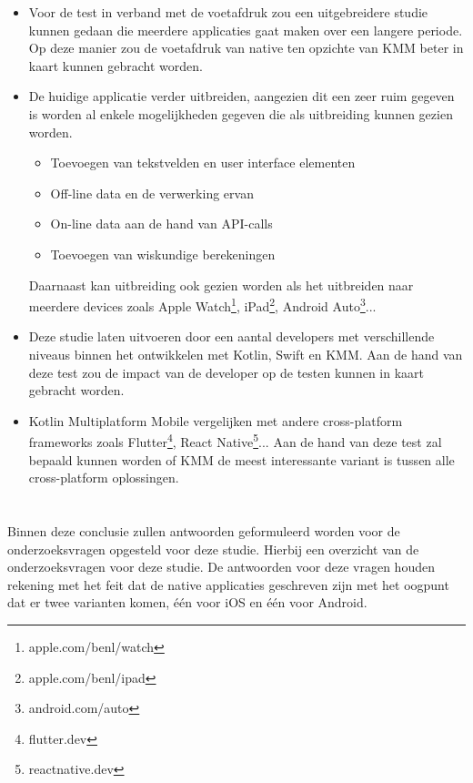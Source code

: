 \begin{itemize}
    \item Voor de test in verband met de voetafdruk zou een uitgebreidere studie kunnen gedaan die meerdere applicaties gaat maken over een langere periode. Op deze manier zou de voetafdruk van native ten opzichte van KMM beter in kaart kunnen gebracht worden.
    
    \item De huidige applicatie verder uitbreiden, aangezien dit een zeer ruim gegeven is worden al enkele mogelijkheden gegeven die als uitbreiding kunnen gezien worden.
    \begin{itemize}
        \item Toevoegen van tekstvelden en user interface elementen
        \item Off-line data en de verwerking ervan
        \item On-line data aan de hand van API-calls
        \item Toevoegen van wiskundige berekeningen
    \end{itemize}
    
    Daarnaast kan uitbreiding ook gezien worden als het uitbreiden naar meerdere devices zoals Apple Watch\footnote{apple.com/benl/watch}, iPad\footnote{apple.com/benl/ipad}, Android Auto\footnote{android.com/auto}... 
    
    \item Deze studie laten uitvoeren door een aantal developers met verschillende niveaus binnen het ontwikkelen met Kotlin, Swift en KMM. Aan de hand van deze test zou de impact van de developer op de testen kunnen in kaart gebracht worden.
    
    \item Kotlin Multiplatform Mobile vergelijken met andere cross-platform frameworks zoals Flutter\footnote{flutter.dev}, React Native\footnote{reactnative.dev}... Aan de hand van deze test zal bepaald kunnen worden of KMM de meest interessante variant is tussen alle cross-platform oplossingen.
\end{itemize}


\section{}
\label{sec:C-algemene-conclusie}    
Binnen deze conclusie zullen antwoorden geformuleerd worden voor de onderzoeksvragen opgesteld voor deze studie. Hierbij een overzicht van de onderzoeksvragen voor deze studie. De antwoorden voor deze vragen houden rekening met het feit dat de native applicaties geschreven zijn met het oogpunt dat er twee varianten komen, één voor iOS en één voor Android.

